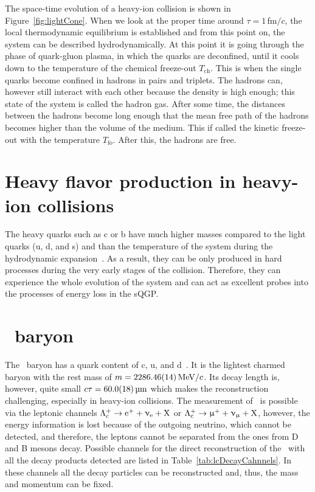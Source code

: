 The space-time evolution of a heavy-ion collision is shown in Figure~\ref{fig:lightCone}. When we look at the proper time around $\tau = 1\,$fm$/c$, the local thermodynamic equilibrium is established and from this point on, the system can be described hydrodynamically. At this point it is going through the phase of quark-gluon plasma, in which the quarks are deconfined, until it cools down to the temperature of the chemical freeze-out $T_\mathrm{ch}$. This is when the single quarks become confined in hadrons in pairs and triplets. The hadrons can, however still interact with each other because the density is high enough; this state of the system is called the hadron gas. After some time, the distances between the hadrons become long enough that the mean free path of the hadrons becomes higher than the volume of the medium. This if called the kinetic freeze-out with the temperature $T_\mathrm{fo}$. After this, the hadrons are free. 


\section{Heavy flavor production in heavy-ion collisions}

The heavy quarks such as c or b have much higher masses compared to the light quarks (u, d, and s) and  than the temperature of the system during the hydrodynamic expansion~\cite{summaryHF}. As a result, they can be only produced in hard processes during the very early stages of the collision. Therefore, they can experience the whole evolution of the system and can act as excellent probes into the processes of energy loss in the sQGP\@.

\section{\Lambdac\ baryon}

The \Lambdac\ baryon has a quark content of c, u, and d~\cite{PDG}. It is the lightest charmed baryon with the rest mass of $m = \SI{2286.46 \pm 0.14}{\mega\electronvolt}/c$\@. Its decay length is, however, quite small $c\tau = \SI{60.0 \pm 1.8}{\micro\metre}$ which makes the reconstruction challenging, especially in heavy-ion collisions. The measurement of \Lambdac\ is possible via the leptonic channels $\Lambda_\text{c}^+ \rightarrow \mathrm{e}^+ + \upnu_\mathrm{e} + \mathrm{X}$ or $\Lambda_\text{c}^+ \rightarrow \upmu^+ + \upnu_\upmu + \mathrm{X}$, however, the energy information is lost because of the outgoing neutrino, which cannot be detected, and therefore, the leptons cannot be separated from the ones from D and B mesons decay. Possible channels for the direct reconstruction of the \Lambdac\ with all the decay products detected are listed in Table~\ref{tab:lcDecayCahnnels}. In these channels all the decay particles can be reconstructed and, thus, the mass and momentum can be fixed.

